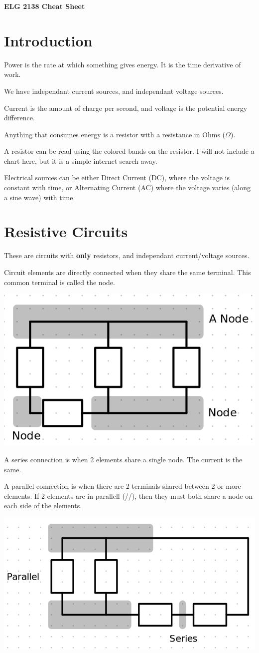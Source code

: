\documentclass[12pt,letterpaper]{article} \usepackage{amsmath} \usepackage{graphicx} \usepackage[margin=1in]{geometry} \usepackage{longtable}  \usepackage{amssymb}
\begin{document}
	
	\begin{center}
		\Large\textbf{ELG 2138 Cheat Sheet} \\
		\vspace{0.5em}
	\end{center}	

	\section{Introduction}
	Power is the rate at which something gives energy. It is the time derivative of work.
	
	We have independant current sources, and independant voltage sources. 
	
	Current is the amount of charge per second, and voltage is the potential energy difference. 
	
	Anything that consumes energy is a resistor with a resistance in Ohms ($\Omega$).
	
	A resistor can be read using the colored bands on the resistor. I will not include a chart here, but it is a simple internet search away.
	
	Electrical sources can be either Direct Current (DC), where the voltage is constant with time, or Alternating Current (AC) where the voltage varies (along a sine wave) with time. 
	
	\section{Resistive Circuits}
	These are circuits with \textbf{only} resistors, and independant current/voltage sources. 
	
	Circuit elements are directly connected when they share the same terminal. This common terminal is called the node. 
	\begin{center}
		\includegraphics[width=0.5\linewidth]{nodes}
	\end{center}
	
	A series connection is when 2 elements share a single node. The current is the same.
	
	A parallel connection is when there are 2 terminals shared between 2 or more elements. If 2 elements are in parallell (//), then they must both share a node on each side of the elements. 
	\begin{center}
		\includegraphics[width=0.5\linewidth]{parallelseries}
	\end{center}
	
\end{document}
